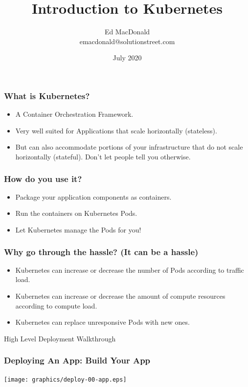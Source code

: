 \documentclass{beamer}
\title[Kubernetes]{Introduction to Kubernetes}
\author[Ed MacDonald]{Ed MacDonald\\emacdonald@solutionstreet.com}
\institute[\href{https://solutionstreet.com}{SolutionStreet}]{SolutionStreet\\\href{https://solutionstreet.com}{(solutionstreet.com)}}
\date{July 2020}
\begin{document}
\frame{\titlepage}

\begin{frame}
\frametitle{What is Kubernetes?}
\begin{itemize}
    \item{A Container Orchestration Framework.}
    \item{Very well suited for Applications that scale horizontally (stateless).}
    \item{But can also accommodate portions of your infrastructure that do not scale horizontally (stateful). Don't let people tell you otherwise.}
\end{itemize}
\end{frame}

\begin{frame}
    \frametitle{How do you use it?}
    \begin{itemize}
        \item{Package your application components as containers.}
        \item{Run the containers on Kubernetes Pods.}
        \item{Let Kubernetes manage the Pods for you!}
    \end{itemize}
\end{frame}

\begin{frame}
    \frametitle{Why go through the hassle? (It can be a hassle)}
    \begin{itemize}
        \item{Kubernetes can increase or decrease the number of Pods according to traffic load.}
        \item{Kubernetes can increase or decrease the amount of compute resources according to compute load.}
        \item{Kubernetes can replace unresponsive Pods with new ones.}
    \end{itemize}
\end{frame}

\begin{frame}
    \begin{center}
        \Huge High Level Deployment Walkthrough
    \end{center}
\end{frame}

\begin{frame}
    \frametitle{Deploying An App: Build Your App}
    \texttt{[image: graphics/deploy-00-app.eps]}
\end{frame}
\end{document}
